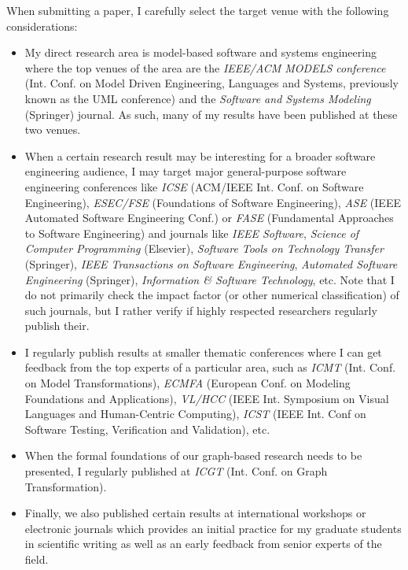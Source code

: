 When submitting a paper, I carefully select the target venue with the following considerations: 
\begin{itemize}
\item My direct research area is model-based software and systems engineering where the top venues of the area are the \emph{IEEE/ACM MODELS conference} (Int. Conf. on Model Driven Engineering, Languages and Systems, previously known as the UML conference) and the \emph{Software and Systems Modeling} (Springer) journal. As such, many of my results have been published at these two venues. 
\item When a certain research result may be interesting for a broader software engineering audience, I may target major general-purpose software engineering conferences like \emph{ICSE} (ACM/IEEE Int. Conf. on Software Engineering), \emph{ESEC/FSE} (Foundations of Software Engineering),  \emph{ASE} (IEEE Automated Software Engineering Conf.) or \emph{FASE} (Fundamental Approaches to Software Engineering) and journals like \emph{IEEE Software}, \emph{Science of Computer Programming} (Elsevier), \emph{Software Tools on Technology Transfer} (Springer), \emph{IEEE Transactions on Software Engineering}, \emph{Automated Software Engineering} (Springer), \emph{Information \& Software Technology}, etc. Note that I do not primarily check the impact factor (or other numerical classification) of such journals, but I rather verify if highly respected researchers regularly publish their.
\item I regularly publish results at smaller thematic conferences where I can get feedback from the top experts of a particular area, such as \emph{ICMT} (Int. Conf. on Model Transformations), \emph{ECMFA} (European Conf. on Modeling Foundations and Applications), \emph{VL/HCC} (IEEE Int. Symposium on Visual Languages and Human-Centric Computing), \emph{ICST} (IEEE Int. Conf on Software Testing, Verification and Validation), etc. 
\item When the formal foundations of our graph-based research needs to be presented, I regularly published at \emph{ICGT} (Int. Conf. on Graph Transformation).
\item Finally, we also published certain results at international workshops or electronic journals which provides an initial practice for my graduate students in scientific writing as well as an early feedback from senior experts of the field. 
\end{itemize}

